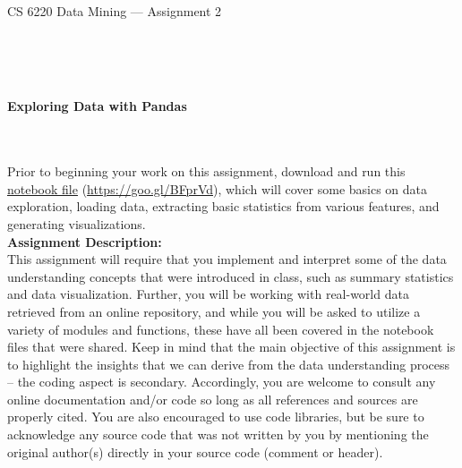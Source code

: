 \documentclass[letter-paper,12pt]{article} %
\begin{document}

\begin{center}
\begin{Large}
CS 6220 Data Mining --- Assignment 2
\end{Large}
\end{center}

\hline
\hline
~\\~\\~\\

\begin{center}
\begin{Large}
\textbf{Exploring Data with Pandas}
\end{Large}
\end{center}
~\\~\\

Prior to beginning your work on this assignment, download and run this \href{https://goo.gl/BFprVd}{notebook file} (\url{https://goo.gl/BFprVd}), which will cover some basics on data exploration, loading data, extracting basic statistics from various features, and generating visualizations.\\

\textbf{Assignment Description:}\\
This assignment will require that you implement and interpret some of the data understanding concepts that were introduced in class, such as summary statistics and data visualization. Further, you will be working with real-world data retrieved from an online repository, and while you will be asked to utilize a variety of modules and functions, these have all been covered in the notebook files that were shared. Keep in mind that the main objective of this assignment is to highlight the insights that we can derive from the data understanding process – the coding aspect is secondary. Accordingly, you are welcome to consult any online documentation and/or code so long as all references and sources are properly cited. You are also encouraged to use code libraries, but be sure to acknowledge any source code that was not written by you by mentioning the original author(s) directly in your source code (comment or header).\\
\end{document}
